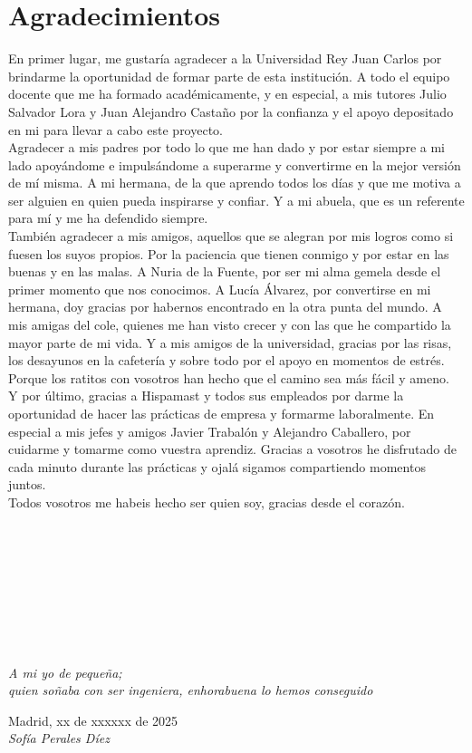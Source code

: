 \cleardoublepage

\chapter*{Agradecimientos}

En primer lugar, me gustaría agradecer a la Universidad Rey Juan Carlos por brindarme la oportunidad de formar parte de esta institución.
A todo el equipo docente que me ha formado académicamente, y en especial, a mis tutores Julio Salvador Lora y Juan Alejandro Castaño por la confianza y el apoyo depositado en mi para llevar a cabo este proyecto.\\

Agradecer a mis padres por todo lo que me han dado y por estar siempre a mi lado apoyándome e impulsándome a superarme y convertirme en la mejor versión de mí misma. 
A mi hermana, de la que aprendo todos los días y que me motiva a ser alguien en quien pueda inspirarse y confiar. 
Y a mi abuela, que es un referente para mí y me ha defendido siempre.\\

También agradecer a mis amigos, aquellos que se alegran por mis logros como si fuesen los suyos propios. 
Por la paciencia que tienen conmigo y por estar en las buenas y en las malas. 
A Nuria de la Fuente, por ser mi alma gemela desde el primer momento que nos conocimos. 
A Lucía Álvarez, por convertirse en mi hermana, doy gracias por habernos encontrado en la otra punta del mundo.
A mis amigas del cole, quienes me han visto crecer y con las que he compartido la mayor parte de mi vida.
Y a mis amigos de la universidad, gracias por las risas, los desayunos en la cafetería y sobre todo por el apoyo en momentos de estrés.
Porque los ratitos con vosotros han hecho que el camino sea más fácil y ameno.\\

Y por último, gracias a Hispamast y todos sus empleados por darme la oportunidad de hacer las prácticas de empresa y formarme laboralmente.
En especial a mis jefes y amigos Javier Trabalón y Alejandro Caballero, por cuidarme y tomarme como vuestra aprendiz. 
Gracias a vosotros he disfrutado de cada minuto durante las prácticas y ojalá sigamos compartiendo momentos juntos.\\

Todos vosotros me habeis hecho ser quien soy, gracias desde el corazón.\\
\ %

\

\

\

\

\begin{flushright}
		\vspace{4.0 cm}
		\emph{A mi yo de pequeña;\\
      quien soñaba con ser ingeniera,
	  enhorabuena lo hemos conseguido}\\
		\par
		\vspace{1.0 cm}
		Madrid, xx de xxxxxx de 2025\\ %
		\emph{Sofía Perales Díez}
\end{flushright}

\thispagestyle{empty}

